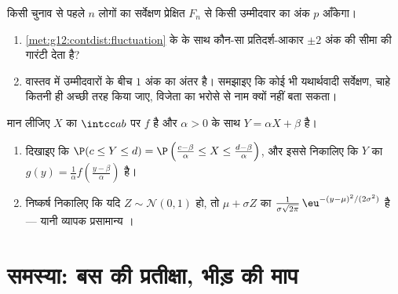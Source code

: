 \begin{exercise}[$\star\star\star$]\label{exo:g12:contdist:8}
किसी चुनाव से पहले $n$ लोगों का सर्वेक्षण प्रेक्षित  $F_n$
से किसी उम्मीदवार का अंक $p$ आँकेगा।
\begin{enumerate}
  \item \cref{met:g12:contdist:fluctuation} के  के साथ कौन-सा प्रतिदर्श-आकार $\pm 2$ अंक की
        सीमा की गारंटी देता है?
  \item वास्तव में उम्मीदवारों के बीच $1$ अंक का अंतर है। समझाइए कि कोई भी
        यथार्थवादी सर्वेक्षण, चाहे कितनी ही अच्छी तरह किया जाए, विजेता का
        भरोसे से नाम क्यों नहीं बता सकता।
\end{enumerate}
\end{exercise}

\begin{exercise}[$\star\star\star$]\label{exo:g12:contdist:9}
मान लीजिए $X$ का  $\intcc ab$ पर $f$ है और $\alpha > 0$ के साथ $Y = \alpha X + \beta$ है।
\begin{enumerate}
  \item दिखाइए कि $\P(c \leq Y \leq d)
        = \P\left(\frac{c - \beta}{\alpha} \leq X \leq
        \frac{d-\beta}{\alpha}\right)$, और इससे निकालिए कि $Y$ का  $g(y) = \frac{1}{\alpha} f\left(\frac{y - \beta}{\alpha}\right)$ है।
  \item निष्कर्ष निकालिए कि यदि $Z \sim \mathcal N(0,1)$ हो, तो $\mu + \sigma Z$ का  $\frac{1}{\sigma\sqrt{2\pi}}\,
        \eu^{-(y - \mu)^2/(2\sigma^2)}$ है ---
        यानी व्यापक प्रसामान्य ।
\end{enumerate}
\end{exercise}

\section{समस्या: बस की प्रतीक्षा, भीड़ की माप}

